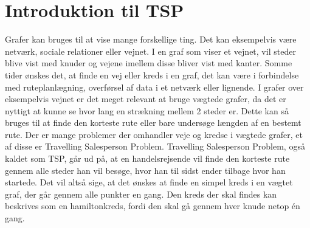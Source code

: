 \section{Introduktion til TSP}
Grafer kan bruges til at vise mange forskellige ting. 
Det kan eksempelvis være netværk, sociale relationer eller vejnet. 
I en graf som viser et vejnet, vil steder blive vist med knuder og vejene imellem disse bliver vist med kanter.
Somme tider ønskes det, at finde en vej eller kreds i en graf, det kan være i forbindelse med ruteplanlægning, overførsel af data i et netværk eller lignende. 
I grafer over eksempelvis vejnet er det meget relevant at bruge vægtede grafer, da det er nyttigt at kunne se hvor lang en strækning mellem 2 steder er.
Dette kan så bruges til at finde den korteste rute eller bare undersøge længden af en bestemt rute. 
Der er mange problemer der omhandler veje og kredse i vægtede grafer, et af disse er Travelling Salesperson Problem.
Travelling Salesperson Problem, også kaldet som TSP, går ud på, at en handelsrejsende vil finde den korteste rute gennem alle steder han vil besøge, hvor han til sidst ender tilbage hvor han startede.
Det vil altså sige, at det ønskes at finde en simpel kreds i en vægtet graf, der går gennem alle punkter en gang. 
Den kreds der skal findes kan beskrives som en hamiltonkreds, fordi den skal gå gennem hver knude netop én gang. 